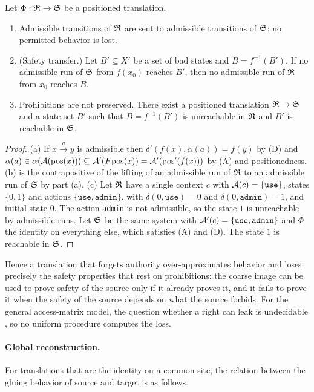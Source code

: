 \begin{proposition}\label{prop:authority}
Let $\Phi:\mathfrak R\to\mathfrak S$ be a positioned translation.
\begin{enumerate}[label=(\alph*)]
\item Admissible transitions of $\mathfrak R$ are sent to admissible transitions of $\mathfrak S$: no permitted behavior is lost.
\item (Safety transfer.) Let $B'\subseteq X'$ be a set of bad states and $B=f^{-1}(B')$. If no admissible run of $\mathfrak S$ from $f(x_0)$ reaches $B'$, then no admissible run of $\mathfrak R$ from $x_0$ reaches $B$.
\item Prohibitions are not preserved. There exist a positioned translation $\mathfrak R\to\mathfrak S$ and a state set $B'$ such that $B=f^{-1}(B')$ is unreachable in $\mathfrak R$ and $B'$ is reachable in $\mathfrak S$.
\end{enumerate}
\end{proposition}
\begin{proof}
(a) If $x\xrightarrow{a}y$ is admissible then $\delta'(f(x),\alpha(a))=f(y)$ by (D) and $\alpha(a)\in\alpha(\mathcal A(\mathrm{pos}(x)))\subseteq\mathcal A'(F\mathrm{pos}(x))=\mathcal A'(\mathrm{pos}'(f(x)))$ by (A) and positionedness. (b) is the contrapositive of the lifting of an admissible run of $\mathfrak R$ to an admissible run of $\mathfrak S$ by part (a). (c) Let $\mathfrak R$ have a single context $c$ with $\mathcal A(c)=\{\texttt{use}\}$, states $\{0,1\}$ and actions $\{\texttt{use},\texttt{admin}\}$, with $\delta(0,\texttt{use})=0$ and $\delta(0,\texttt{admin})=1$, and initial state $0$. The action \texttt{admin} is not admissible, so the state $1$ is unreachable by admissible runs. Let $\mathfrak S$ be the same system with $\mathcal A'(c)=\{\texttt{use},\texttt{admin}\}$ and $\Phi$ the identity on everything else, which satisfies (A) and (D). The state $1$ is reachable in $\mathfrak S$.
\end{proof}

Hence a translation that forgets authority over-approximates behavior and loses precisely the safety properties that rest on prohibitions: the coarse image can be used to prove safety of the source only if it already proves it, and it fails to prove it when the safety of the source depends on what the source forbids. For the general access-matrix model, the question whether a right can leak is undecidable \cite{hru}, so no uniform procedure computes the loss.

\paragraph{Global reconstruction.} For translations that are the identity on a common site, the relation between the gluing behavior of source and target is as follows.

